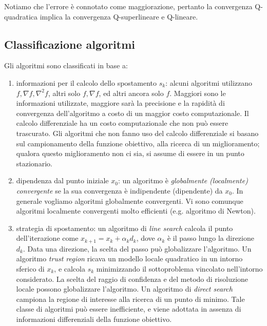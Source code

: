 Notiamo che l'errore è connotato come maggiorazione, pertanto la convergenza Q-quadratica implica la convergenza Q-superlineare e Q-lineare.


\subsection{Classificazione algoritmi}

Gli algoritmi sono classificati in base a:

\begin{enumerate}
	\item informazioni per il calcolo dello spostamento $s_{k}$:
	alcuni algoritmi utilizzano $f,\nabla f, \nabla^{2}f$, altri solo $f,\nabla f$, ed altri ancora solo $f$. Maggiori sono le informazioni utilizzate, maggiore sarà la precisione e la rapidità di convergenza dell'algoritmo a costo di un maggior costo computazionale. Il calcolo differenziale ha un costo computazionale che non può essere trascurato. Gli algoritmi che non fanno uso del calcolo differenziale si basano sul campionamento della funzione obiettivo, alla ricerca di un miglioramento; qualora questo miglioramento non ci sia, si assume di essere in un punto stazionario.

	\item dipendenza dal punto iniziale $x_{0}$:
	un algoritmo è \textit{globalmente (localmente) convergente} se la sua convergenza è indipendente (dipendente) da $x_{0}$. In generale vogliamo algoritmi globalmente convergenti. Vi sono comunque algoritmi localmente convergenti molto efficienti (e.g. algoritmo di Newton).

	\item  strategia di spostamento:
	un algoritmo di \textit{line search} calcola il punto dell'iterazione come $x_{k+1}=x_{k}+\alpha_{k}d_{k}$, dove $\alpha_{k}$ è il passo lungo la direzione $d_{k}$. Data una direzione, la scelta del passo può globalizzare l'algoritmo.
	Un algoritmo \textit{trust region} ricava un modello locale quadratico in un intorno sferico di $x_{k}$, e calcola $s_{k}$ minimizzando il sottoproblema vincolato nell'intorno considerato.  La scelta del raggio di confidenza e del metodo di risoluzione locale possono globalizzare l'algoritmo.
	Un algoritmo di \textit{direct search} campiona la regione di interesse alla ricerca di un punto di minimo. Tale classe di algoritmi può essere inefficiente, e viene adottata in assenza di informazioni differenziali della funzione obiettivo.
\end{enumerate}
